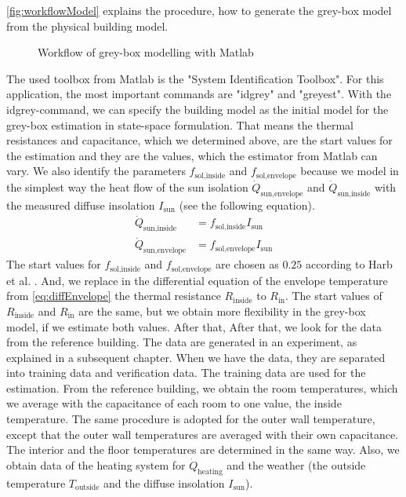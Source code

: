     \autoref{fig:workflowModel} explains the procedure, how to generate the grey-box model from the physical building model.\newline 
    \begin{figure}[h]
            \centering
            \def\svgwidth{400pt}
            
            \caption{Workflow of grey-box modelling with Matlab}
            \label{fig:workflowModel}
    \end{figure}
    The used toolbox from Matlab is the "System Identification Toolbox". For this application, the most important commands are "idgrey" and "greyest".
    With the idgrey-command, we can specify the building model as the initial model for the grey-box estimation in state-space formulation. That means the thermal resistances and capacitance, which we determined above, are the start values for the estimation and they are the values, which the estimator from Matlab can vary.
    We also identify the parameters $f_\text{sol,inside}$ and $f_\text{sol,envelope}$ because we model in the simplest way the heat flow of the sun isolation $\dot{Q}_\text{sun,envelope}$ and $\dot{Q}_\text{sun,inside}$ with the measured diffuse insolation $I_\text{sun}$ (see the following equation). 
    \begin{align}
       \label{eq:sun}
        \dot{Q}_\text{sun,inside} &= f_\text{sol,inside} I_\text{sun} \\
        \dot{Q}_\text{sun,envelope} &= f_\text{sol,envelope} I_\text{sun} \nonumber 
    \end{align}
    The start values for $f_\text{sol,inside}$ and $f_\text{sol,envelope}$ are chosen as $0.25$ according to Harb et al. \cite{Harb.2016}. And, we replace in the differential equation of the envelope temperature from \autoref{eq:diffEnvelope} the thermal resistance $R_\text{inside}$ to $R_\text{in}$. The start values of $R_\text{inside}$ and $R_\text{in}$ are the same, but we obtain more flexibility in the grey-box model, if we estimate both values.\newline
    After that, 
    After that, we look for the data from the reference building. The data are generated in an experiment, as explained in a subsequent chapter. When we have the data, they are separated into training data and verification data. The training data are used for the estimation. From the reference building, we obtain the room temperatures, which we average with the capacitance of each room to one value, the inside temperature. The same procedure is adopted for the outer wall temperature, except that the outer wall temperatures are averaged with their own capacitance. The interior and the floor temperatures are determined in the same way. Also, we obtain data of the heating system for $\dot{Q}_\text{heating}$ and the weather (the outside temperature $T_\text{outside}$ and the diffuse insolation $I_\text{sun}$). \newline
